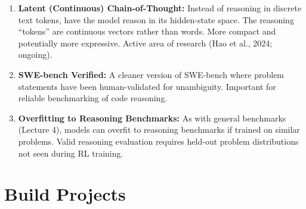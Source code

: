 \documentclass[11pt, a4paper]{article}
\begin{document}
\begin{enumerate}[leftmargin=2em]
  \item \textbf{Latent (Continuous) Chain-of-Thought:} Instead of reasoning in discrete text tokens, have the model reason in its hidden-state space. The reasoning ``tokens'' are continuous vectors rather than words. More compact and potentially more expressive. Active area of research (Hao et al., 2024; ongoing).

  \item \textbf{SWE-bench Verified:} A cleaner version of SWE-bench where problem statements have been human-validated for unambiguity. Important for reliable benchmarking of code reasoning.

  \item \textbf{Overfitting to Reasoning Benchmarks:} As with general benchmarks (Lecture 4), models can overfit to reasoning benchmarks if trained on similar problems. Valid reasoning evaluation requires held-out problem distributions not seen during RL training.
\end{enumerate}

\newpage
\section{Build Projects}
\end{document}
